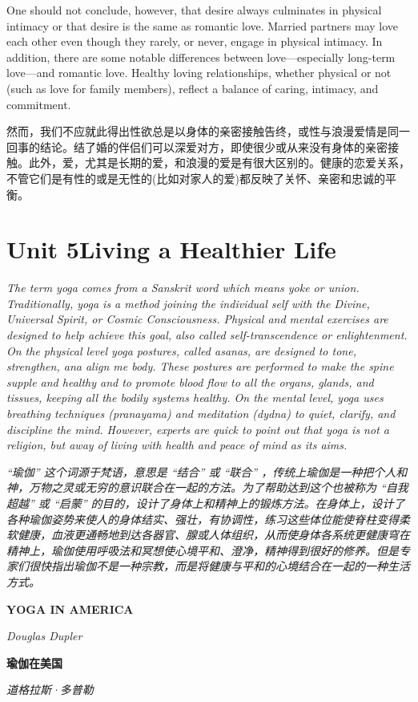 \documentclass[cs4size, a4paper,12pt]{article}
\newcounter{numpar}
\newcommand*{\newpar}{\numpar{}}
\begin{document}
\newpar  One should not conclude, however, that desire always culminates in physical intimacy
or that desire is the same as romantic love. Married partners may love each other even though they rarely, or never, engage in physical intimacy. In addition, there are some notable differences between love---especially long-term love---and romantic love. Healthy loving relationships, whether physical or not (such as love for family members), reflect a balance of caring, intimacy, and commitment.

然而，我们不应就此得出性欲总是以身体的亲密接触告终，或性与浪漫爱情是同一回事的结论。结了婚的伴侣们可以深爱对方，即使很少或从来没有身体的亲密接触。此外，爱，尤其是长期的爱，和浪漫的爱是有很大区别的。健康的恋爱关系，不管它们是有性的或是无性的(比如对家人的爱)都反映了关怀、亲密和忠诚的平衡。

\section*{Unit 5\qquad{}Living a Healthier Life}
\setcounter{numpar}{0}
\textit{The term yoga comes from a Sanskrit word which means yoke or union. Traditionally,
yoga is a method joining the individual self with the Divine, Universal Spirit, or Cosmic
Consciousness. Physical and mental exercises are designed to help achieve this goal, also called self-transcendence or enlightenment. On the physical  level yoga postures, called asanas, are designed to tone, strengthen, ana align me body. These postures are performed to make the spine supple and healthy and to promote blood flow to all the organs, glands, and tissues, keeping all the bodily systems healthy. On the mental level, yoga uses breathing techniques (pranayama) and meditation (dydna) to quiet, clarify, and discipline the mind. However, experts are quick to point out that yoga is not a religion, but away of living with health and peace of mind as its aims.}

\textit{``瑜伽'' 这个词源于梵语，意思是 ``结合'' 或 ``联合'' ，传统上瑜伽是一种把个人和神，万物之灵或无穷的意识联合在一起的方法。为了帮助达到这个也被称为 ``自我超越'' 或 ``启蒙'' 的目的，设计了身体上和精神上的锻炼方法。在身体上，设计了各种瑜伽姿势来使人的身体结实、强壮，有协调性，练习这些体位能使脊柱变得柔软健康，血液更通畅地到达各器官、腺或人体组织，从而使身体各系统更健康穹在精神上，瑜伽使用呼吸法和冥想使心境平和、澄净，精神得到很好的修养。但是专家们很快指出瑜伽不是一种宗教，而是将健康与平和的心境结合在一起的一种生活方式。}

\begin{center}
	\textcolor{tcolor}{\bf YOGA IN AMERICA}
	
	\hfill{\textit{Douglas Dupler}}
	
	\textcolor{tcolor}{\bf 瑜伽在美国}
	
	\hfill{\textit{道格拉斯·多普勒}}
\end{center}
\end{document}
